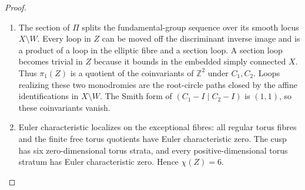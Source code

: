 \begin{proof}
\begin{enumerate}[label=\arabic*.,leftmargin=*]
\item The section of $\Pi$ splits the fundamental-group sequence over its
smooth locus $X\setminus W$.  Every loop in $Z$ can be moved off
the discriminant inverse image and is a product of a loop in the
elliptic fibre and a section loop.  A section loop becomes trivial
in $Z$ because it bounds in the embedded simply connected $X$.
Thus $\pi_1(Z)$ is a quotient of the coinvariants of
$\mathbb Z^2$ under $C_1,C_2$.  Loops realizing these two
monodromies are the root-circle paths closed by the affine
identifications in $X\setminus W$.  The Smith form of
$(C_1-I\mid C_2-I)$ is $(1,1)$, so these coinvariants vanish.

\item Euler characteristic localizes on the exceptional fibres: all
regular torus fibres and the finite free torus quotients have Euler
characteristic zero.  The cusp has six zero-dimensional torus
strata, and every positive-dimensional torus stratum has Euler
characteristic zero.  Hence $\chi(Z)=6$.


\end{enumerate}
\end{proof}
